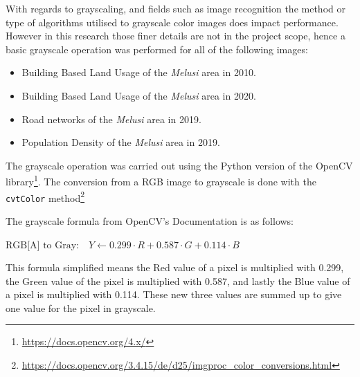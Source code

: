 With regards to grayscaling, and fields such as image recognition the method or type of algorithms utilised to grayscale color images does impact performance.\cite{gray} However in this research those finer details are not in the project scope, hence a basic grayscale operation was performed for all of the following images:
\begin{itemize}
\item Building Based Land Usage of the \textit{Melusi} area in 2010.
\item Building Based Land Usage of the \textit{Melusi} area in 2020.
\item Road networks of the \textit{Melusi} area in 2019.
\item Population Density of the \textit{Melusi} area in 2019.
\end{itemize}

The grayscale operation was carried out using the Python version of the OpenCV library\footnote{\url{https://docs.opencv.org/4.x/}}. The conversion from a RGB image to grayscale is done with the \texttt{cvtColor} method\footnote{\url{https://docs.opencv.org/3.4.15/de/d25/imgproc_color_conversions.html}}

The grayscale formula from OpenCV's Documentation is as follows:
\begin{center}
$\text{RGB[A] to Gray:} \quad Y \leftarrow 0.299 \cdot R + 0.587 \cdot G + 0.114 \cdot B$
\end{center}
This formula simplified means the Red value of a pixel is multiplied with 0.299, the Green value of the pixel is multiplied with 0.587, and lastly the Blue value of a pixel is multiplied with 0.114. These new three values are summed up to give one value for the pixel in grayscale.

